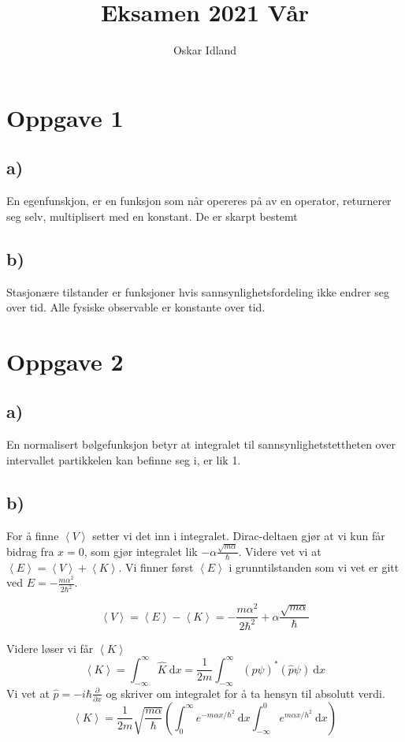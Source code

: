 \documentclass{article}
\author{Oskar Idland}
\title{Eksamen 2021 Vår}
\date{}
\begin{document}
\maketitle
\newpage

\section*{Oppgave 1}
  \subsection*{a)}
  En egenfunskjon, er en funksjon som når opereres på av en operator, returnerer seg selv, multiplisert med en konstant. De er skarpt bestemt
  
  \subsection*{b)}
    Stasjonære tilstander er funksjoner hvis sannsynlighetsfordeling ikke endrer seg over tid. Alle fysiske observable er konstante over tid. 
    
\section*{Oppgave 2}
  \subsection*{a)}
    En normalisert bølgefunksjon betyr at integralet til sannsynlighetstettheten over intervallet partikkelen kan befinne seg i, er lik 1.
    
  \subsection*{b)}
    For å finne $\left<V\right>$ setter vi det inn i integralet. Dirac-deltaen gjør at vi kun får bidrag fra $x=0$, som gjør integralet lik $-α \frac{\sqrt{mα}}{ℏ}$. Videre vet vi at $\left<E\right> = \left<V\right> + \left<K\right>$. Vi finner først $\left<E\right>$ i grunntilstanden som vi vet er gitt ved $E = - \frac{mα^2}{2ℏ^2}$. 
    
    \[
    \left<V\right> = \left<E\right> - \left<K\right> = - \frac{mα^2}{2ℏ^2} + α \frac{\sqrt{mα}}{ℏ} 
    \]
    
    
    
    Videre løser vi får $\left<K\right>$
    \[
    \left<K\right> = ∫_{-∞}^{∞} \hat{K} \ \mathrm{d}x = \frac{1}{2m} ∫_{-∞}^{∞} (\hat{p}ψ)^{*} (\hat{p}ψ) \ \mathrm{d}x
    \]
    Vi vet at $\hat{p} = - iℏ \frac{∂}{∂x}$ og skriver om integralet for å ta hensyn til absolutt verdi. 
    \[
    \left<K\right> = \frac{1}{2m} \sqrt{\frac{mα}{ℏ}} \left(∫_{0}^{∞} e^{-mαx / ℏ^2} \ \mathrm{d}x ∫_{-∞}^{0} e^{mαx / h^2} \ \mathrm{d}x\right)
    \]
  
\end{document}
